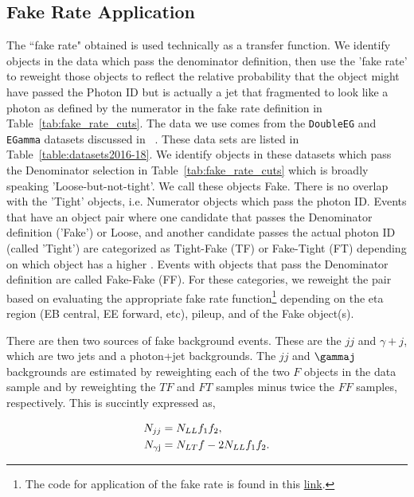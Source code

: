 \subsection{Fake Rate Application}
The ``fake rate" obtained is used technically as a transfer function. We identify objects in the data which pass the denominator definition, then use the 'fake rate' to reweight those objects to reflect the relative probability that the object might have passed the Photon ID but is actually a jet that fragmented to look like a photon as defined by the numerator in the fake rate definition in Table~\ref{tab:fake_rate_cuts}. The data we use comes from the \texttt{DoubleEG} and \texttt{EGamma} datasets discussed in ~\label{sec:datasets}. These data sets are listed in Table~\ref{table:datasets2016-18}. We identify objects in these datasets which pass the Denominator selection in Table~\ref{tab:fake_rate_cuts} which is broadly speaking 'Loose-but-not-tight'. We call these objects Fake. There is no overlap with the 'Tight' objects, i.e. Numerator objects which pass the photon ID. Events that have an object pair where one candidate that passes the Denominator definition ('Fake') or Loose, and another candidate passes the actual photon ID (called 'Tight') are categorized as Tight-Fake (TF) or Fake-Tight (FT) depending on which object has a higher \pt. Events with objects that pass the Denominator definition are called Fake-Fake (FF). For these categories, we reweight the pair based on evaluating the appropriate fake rate function\footnote{The code for application of the fake rate is found in this \href{https://github.com/cms-exotica-diphotons/diphoton-analysis/blob/51de0227dce50e5ff11c2e0f718ca692094ee9bc/Tools/interface/fakePrediction.C#L249-L255}{link}.} depending on the eta region (EB central, EE forward, etc), pileup, and \pt of the Fake object(s). 

There are then two sources of fake background events. These are the $jj$ and $\gamma + j$, which are two jets and a photon+jet backgrounds. The $jj$ and $\gammaj$  backgrounds are estimated by reweighting each of the two $F$ objects in the data sample and by reweighting the $TF$ and $FT$ samples minus twice the $FF$ samples, respectively. This is succintly expressed as,

\begin{equation} \label{eq:nfake}
\begin{align}
   N_{jj} &= N_{LL}f_1f_2, \\
   N_{\gamma\textnormal{j}} &= N_{LT}f -  2N_{LL}f_1f_2. 
\end{align}
\end{equation}

